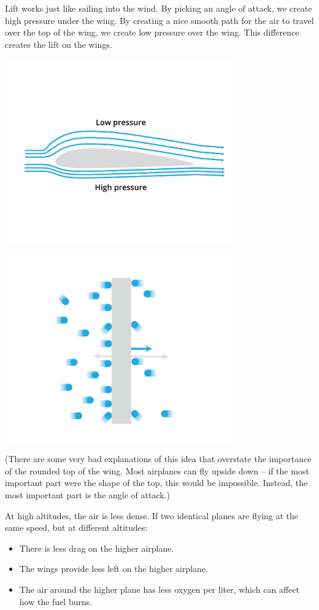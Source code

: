 Lift works just like sailing into the wind. By picking an angle of attack, we create high pressure under the wing.  By creating a nice smooth path for the 
air to travel over the top of the wing,  we create low pressure over the wing.  This difference creates the lift on the wings.

\includegraphics[width=0.75\textwidth]{airfoil.png}

\includegraphics[width=0.75\textwidth]{pressureMicro.png}

(There are some very bad explanations of this idea that overstate the importance of the rounded top of the wing.   Most airplanes can fly upside down -- if the 
most important part were the shape of the top,  this would be impossible. Instead, the most important part is the angle of attack.)

At high altitudes,  the air is less dense.  If two identical planes are flying  at the same speed,  but at different altitudes: 
\begin{itemize}
\item There is less drag on the higher airplane.
\item The wings provide less left on the higher airplane.
\item The air around the higher plane has less oxygen per liter, which can affect how the fuel burns.
\end{itemize}

